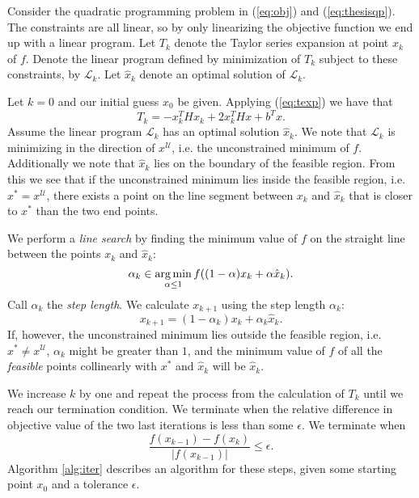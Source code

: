 Consider the quadratic programming problem in (\ref{eq:obj}) and
(\ref{eq:thesisqp}).
The constraints are all linear, so by only linearizing the objective function
we end up with a linear program.
Let $T_k$ denote the Taylor series expansion at point $x_k$ of $f$.
Denote the linear program defined by minimization of $T_k$ subject to these
constraints, by $\mathcal{L}_k$.
Let $\hat{x}_k$ denote an optimal solution of $\mathcal{L}_k$.

Let $k = 0$ and our initial guess $x_0$ be given.
Applying (\ref{eq:texp}) we have that
\[
T_k = - x_k^THx_k + 2x_k^THx + b^Tx.
\]
Assume the linear program $\mathcal{L}_k$ has an optimal solution $\hat{x}_k$.
We note that $\mathcal{L}_k$ is minimizing in the direction of
$x^{\mathcal{U}}$, i.e. the unconstrained minimum of $f$.
Additionally we note that $\hat{x}_k$ lies on the boundary of the feasible
region.
From this we see that if the unconstrained minimum lies inside the feasible
region, i.e. $x^* = x^\mathcal{U}$, there exists a point on the line segment
between $x_k$ and $\hat{x}_k$ that is closer to $x^*$ than the two end points.

We perform a \emph{line search} by finding the minimum value of $f$ on the
straight line between the points $x_k$ and $\hat{x}_k$:
\[
\alpha_k \in \operatorname*{arg\,min}_{\alpha \leq 1} f((1-\alpha) x_k + \alpha \hat{x}_k).
\]
Call $\alpha_k$ the \emph{step length}.
We calculate $x_{k+1}$ using the step length $\alpha_k$:
\[
x_{k+1} = (1-\alpha_k) x_k + \alpha_k\hat{x}_k.
\]
If, however, the unconstrained minimum lies outside the feasible region, i.e.
$x^* \neq x^\mathcal{U}$, $\alpha_k$ might be greater than $1$, and the
minimum value of $f$ of all the \emph{feasible} points collinearly with $x^*$
and $\hat{x}_k$ will be $\hat{x}_k$.

We increase $k$ by one and repeat the process from the calculation of $T_k$
until we reach our termination condition.
We terminate when the relative difference in objective value of the two last
iterations is less than some $\epsilon$. We terminate when
\[
\frac{f(x_{k-1}) - f(x_k)}{|f(x_{k-1})|} \leq \epsilon.
\]
Algorithm \ref{alg:iter} describes an algorithm for these steps, given some
starting point $x_0$ and a tolerance $\epsilon$.


